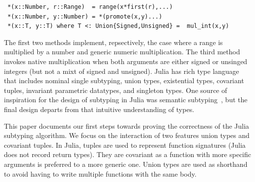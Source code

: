 \documentclass[a4paper,english]{lipics-v2019}
\begin{document}
\begin{lstlisting}
 *(x::Number, r::Range)  = range(x*first(r),...)
 *(x::Number, y::Number) = *(promote(x,y)...)
 *(x::T, y::T) where T <: Union{Signed,Unsigned} =  mul_int(x,y)
\end{lstlisting}

\noindent The first two methods implement, repsectively, the case where a
range is multiplied by a number and generic numeric multiplication.  The
third method invokes native multiplication when both arguments are either
signed or unsinged integers (but not a mixt of signed and unsigned).
Julia has rich type language that includes nominal single subtyping, union
types, existential types, covariant tuples, invariant parametric datatypes,
and singleton types. One source of inspiration for the design of subtyping
in Julia was semantic subtyping~\cite{Frisch02}, but the final design
departs from that intuitive understanding of types.

This paper documents our first steps towards proving the correctness of the
Julia subtyping algorithm. We focus on the interaction of two features union
types and covariant tuples. In Julia, tuples are used to represent function
signatures (Julia does not record return types). They are covariant as a
function with more specific arguments is preferred to a more generic one.
Union types are used as shorthand to avoid having to write multiple
functions with the same body.
\end{document}
